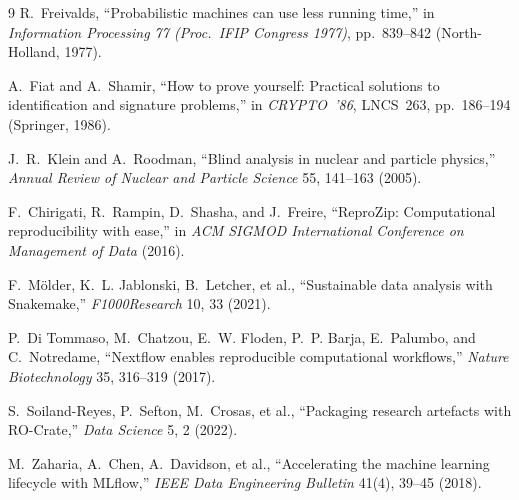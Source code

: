 \documentclass[11pt]{article}
\begin{document}
\begin{thebibliography}{9}
R.~Freivalds, ``Probabilistic machines can use less running time,'' in
\emph{Information Processing 77 (Proc.\ IFIP Congress 1977)}, pp.~839--842
(North-Holland, 1977).

A.~Fiat and A.~Shamir, ``How to prove yourself: Practical solutions to
identification and signature problems,'' in \emph{CRYPTO~'86}, LNCS~263,
pp.~186--194 (Springer, 1986).

J.~R.~Klein and A.~Roodman, ``Blind analysis in nuclear and particle
physics,'' \emph{Annual Review of Nuclear and Particle Science} 55, 141--163
(2005).

F.~Chirigati, R.~Rampin, D.~Shasha, and J.~Freire, ``ReproZip: Computational
reproducibility with ease,'' in \emph{ACM SIGMOD International Conference on
Management of Data} (2016).

F.~M\"older, K.~L. Jablonski, B.~Letcher, et al., ``Sustainable data analysis
with Snakemake,'' \emph{F1000Research} 10, 33 (2021).

P.~Di Tommaso, M.~Chatzou, E.~W. Floden, P.~P. Barja, E.~Palumbo, and
C.~Notredame, ``Nextflow enables reproducible computational workflows,''
\emph{Nature Biotechnology} 35, 316--319 (2017).

S.~Soiland-Reyes, P.~Sefton, M.~Crosas, et al., ``Packaging research
artefacts with RO-Crate,'' \emph{Data Science} 5, 2 (2022).

M.~Zaharia, A.~Chen, A.~Davidson, et al., ``Accelerating the machine learning
lifecycle with MLflow,'' \emph{IEEE Data Engineering Bulletin} 41(4), 39--45 (2018).

\end{thebibliography}
\end{document}
